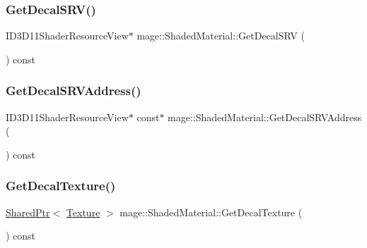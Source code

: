 \hypertarget{structmage_1_1_shaded_material_ad16addcaa9b32b7a9d5ce793d55b1b2c}{}\label{structmage_1_1_shaded_material_ad16addcaa9b32b7a9d5ce793d55b1b2c} 
\subsubsection{\texorpdfstring{Get\+Decal\+S\+R\+V()}{GetDecalSRV()}}
{\footnotesize\ttfamily I\+D3\+D11\+Shader\+Resource\+View$\ast$ mage\+::\+Shaded\+Material\+::\+Get\+Decal\+S\+RV (\begin{DoxyParamCaption}{ }\end{DoxyParamCaption}) const\hspace{0.3cm}{\ttfamily [noexcept]}}

\hypertarget{structmage_1_1_shaded_material_ac6bd86176058b7fdeb4c9a7823ff8c71}{}\label{structmage_1_1_shaded_material_ac6bd86176058b7fdeb4c9a7823ff8c71} 
\subsubsection{\texorpdfstring{Get\+Decal\+S\+R\+V\+Address()}{GetDecalSRVAddress()}}
{\footnotesize\ttfamily I\+D3\+D11\+Shader\+Resource\+View$\ast$ const$\ast$ mage\+::\+Shaded\+Material\+::\+Get\+Decal\+S\+R\+V\+Address (\begin{DoxyParamCaption}{ }\end{DoxyParamCaption}) const\hspace{0.3cm}{\ttfamily [noexcept]}}

\hypertarget{structmage_1_1_shaded_material_affd31417050c3fa426791fa521c03fc9}{}\label{structmage_1_1_shaded_material_affd31417050c3fa426791fa521c03fc9} 
\subsubsection{\texorpdfstring{Get\+Decal\+Texture()}{GetDecalTexture()}}
{\footnotesize\ttfamily \hyperlink{namespacemage_a1e01ae66713838a7a67d30e44c67703e}{Shared\+Ptr}$<$ \hyperlink{classmage_1_1_texture}{Texture} $>$ mage\+::\+Shaded\+Material\+::\+Get\+Decal\+Texture (\begin{DoxyParamCaption}{ }\end{DoxyParamCaption}) const\hspace{0.3cm}{\ttfamily [noexcept]}}


